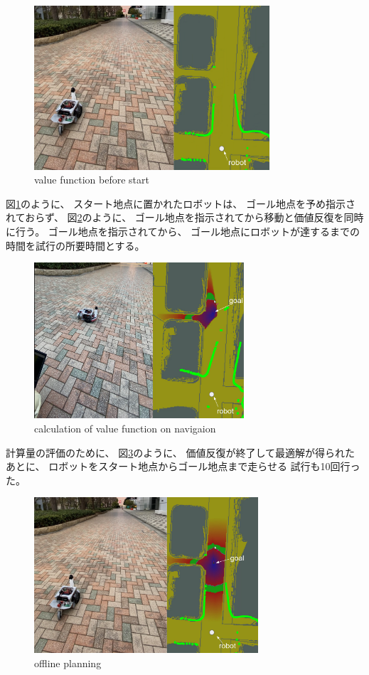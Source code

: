 \documentclass{jarticle}
\begin{document}
\begin{figure}[htb]
  \centering
   \includegraphics[height=61mm]{./figs/raspicat-start.png}
   \caption{value function before start}
	\label{fig:raspicat-start}
\end{figure}

図\ref{fig:raspicat-start}のように、
スタート地点に置かれたロボットは、
ゴール地点を予め指示されておらず、
図\ref{fig:raspicat-no-local}のように、
ゴール地点を指示されてから移動と価値反復を同時に行う。
ゴール地点を指示されてから、
ゴール地点にロボットが達するまでの時間を試行の所要時間とする。

\begin{figure}[htb]
  \centering
   \includegraphics[height=58mm]{./figs/raspicat-online.png}
   \caption{calculation of value function on navigaion}
	\label{fig:raspicat-no-local}
\end{figure}

計算量の評価のために、
図\ref{fig:raspicat-after-planning}のように、
価値反復が終了して最適解が得られたあとに、
ロボットをスタート地点からゴール地点まで走らせる
試行も10回行った。

\begin{figure}[htb]
  \centering
   \includegraphics[height=58mm]{./figs/raspicat-offline.png}
   \caption{offline planning}
	\label{fig:raspicat-after-planning}
\end{figure}
\end{document}
